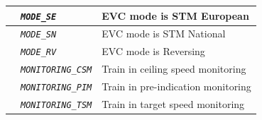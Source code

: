\documentclass{template/openetcs}
\begin{document}
\begin{itemize}
\begin{longtable}{|l|l|l|}
			\hline
	
			&	\begin{minipage}[t]{0.40\linewidth} \emph{\texttt{MODE\_SE}} \end{minipage}
			&	\begin{minipage}[t]{0.38\linewidth} EVC mode is STM European \end{minipage} \\ 
	
			\hline
	
			&	\begin{minipage}[t]{0.40\linewidth} \emph{\texttt{MODE\_SN}} \end{minipage}
			&	\begin{minipage}[t]{0.38\linewidth} EVC mode is STM National \end{minipage} \\ 
	
			\hline
	
			&	\begin{minipage}[t]{0.40\linewidth} \emph{\texttt{MODE\_RV}} \end{minipage}
			&	\begin{minipage}[t]{0.38\linewidth} EVC mode is Reversing \end{minipage} \\ 
	
			\hline
	
			&	\begin{minipage}[t]{0.40\linewidth} \emph{\texttt{MONITORING\_CSM}} \end{minipage}
			&	\begin{minipage}[t]{0.38\linewidth} Train in ceiling speed monitoring \end{minipage} \\ 
	
			\hline
	
			&	\begin{minipage}[t]{0.40\linewidth} \emph{\texttt{MONITORING\_PIM}} \end{minipage}
			&	\begin{minipage}[t]{0.38\linewidth} Train in pre-indication monitoring \end{minipage} \\ 
	
			\hline
	
			&	\begin{minipage}[t]{0.40\linewidth} \emph{\texttt{MONITORING\_TSM}} \end{minipage}
			&	\begin{minipage}[t]{0.38\linewidth} Train in target speed monitoring \end{minipage} \\ 
	

\end{longtable}
\end{itemize}
\end{document}
